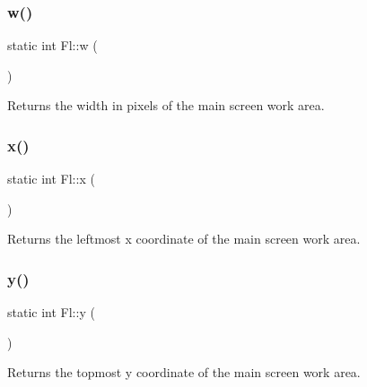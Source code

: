\mbox{\label{group__fl__screen_ga4fcd39428db4299026322c91715cf379}} 
\subsubsection{\texorpdfstring{w()}{w()}}
{\footnotesize\ttfamily static int Fl\+::w (\begin{DoxyParamCaption}{ }\end{DoxyParamCaption})\hspace{0.3cm}{\ttfamily [static]}}

Returns the width in pixels of the main screen work area. \mbox{\label{group__fl__screen_ga129f4b9d14ad1d720d60b7881693d6ec}} 
\subsubsection{\texorpdfstring{x()}{x()}}
{\footnotesize\ttfamily static int Fl\+::x (\begin{DoxyParamCaption}{ }\end{DoxyParamCaption})\hspace{0.3cm}{\ttfamily [static]}}

Returns the leftmost x coordinate of the main screen work area. \mbox{\label{group__fl__screen_ga6c89bea45612ee83941e879b3396d3a5}} 
\subsubsection{\texorpdfstring{y()}{y()}}
{\footnotesize\ttfamily static int Fl\+::y (\begin{DoxyParamCaption}{ }\end{DoxyParamCaption})\hspace{0.3cm}{\ttfamily [static]}}

Returns the topmost y coordinate of the main screen work area. 